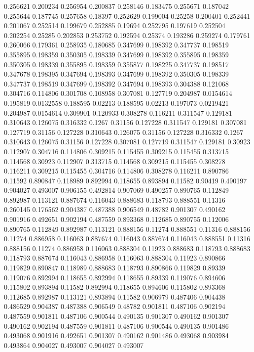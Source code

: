 0.256621 0.200234
0.256954 0.200837
0.258146 0.183475
0.255671 0.187042
0.255644 0.187745
0.257658 0.18397
0.252629 0.199004
0.25258 0.200401
0.252441 0.201067
0.252514 0.199679
0.252885 0.19694
0.252795 0.197619
0.252504 0.202254
0.25285 0.202853
0.253752 0.192594
0.25374 0.193286
0.259274 0.179761
0.260066 0.179361
0.258935 0.180685
0.347699 0.198392
0.347737 0.198519
0.355895 0.198359
0.350305 0.198339
0.347699 0.198392
0.355895 0.198359
0.350305 0.198339
0.355895 0.198359
0.355877 0.198225
0.347737 0.198517
0.347678 0.198395
0.347694 0.198393
0.347699 0.198392
0.350305 0.198339
0.347737 0.198519
0.347699 0.198392
0.347694 0.198393
0.304388 0.121068
0.304716 0.114806
0.301708 0.108958
0.307081 0.127719
0.204987 0.0154614
0.195819 0.0132558
0.188595 0.02213
0.188595 0.02213
0.197073 0.0219421
0.204987 0.0154614
0.309901 0.120933
0.308278 0.116211
0.311547 0.129181
0.310643 0.126075
0.316332 0.1267
0.31156 0.127228
0.311547 0.129181
0.307081 0.127719
0.31156 0.127228
0.310643 0.126075
0.31156 0.127228
0.316332 0.1267
0.310643 0.126075
0.31156 0.127228
0.307081 0.127719
0.311547 0.129181
0.30923 0.112907
0.304716 0.114806
0.309215 0.115455
0.309215 0.115455
0.313715 0.114568
0.30923 0.112907
0.313715 0.114568
0.309215 0.115455
0.308278 0.116211
0.309215 0.115455
0.304716 0.114806
0.308278 0.116211
0.890786 0.11592
0.890847 0.118989
0.892994 0.118655
0.893894 0.11582
0.90419 0.490197
0.904027 0.493007
0.906155 0.492814
0.907069 0.490257
0.890765 0.112849
0.892987 0.113121
0.887674 0.116043
0.888683 0.118793
0.888551 0.11316
0.260145 0.176562
0.904387 0.487388
0.906549 0.48782
0.901307 0.490162
0.901916 0.492651
0.902194 0.487559
0.893368 0.112685
0.890755 0.112006
0.890765 0.112849
0.892987 0.113121
0.888156 0.11274
0.888551 0.11316
0.888156 0.11274
0.886958 0.116063
0.887674 0.116043
0.887674 0.116043
0.888551 0.11316
0.888156 0.11274
0.886958 0.116063
0.888304 0.11923
0.888683 0.118793
0.888683 0.118793
0.887674 0.116043
0.886958 0.116063
0.888304 0.11923
0.890866 0.119829
0.890847 0.118989
0.888683 0.118793
0.890866 0.119829
0.89339 0.119076
0.892994 0.118655
0.892994 0.118655
0.89339 0.119076
0.894606 0.115802
0.893894 0.11582
0.892994 0.118655
0.894606 0.115802
0.893368 0.112685
0.892987 0.113121
0.893894 0.11582
0.906979 0.487406
0.904438 0.486529
0.904387 0.487388
0.906549 0.48782
0.901811 0.487106
0.902194 0.487559
0.901811 0.487106
0.900544 0.490135
0.901307 0.490162
0.901307 0.490162
0.902194 0.487559
0.901811 0.487106
0.900544 0.490135
0.901486 0.493068
0.901916 0.492651
0.901307 0.490162
0.901486 0.493068
0.903984 0.493864
0.904027 0.493007
0.904027 0.493007
